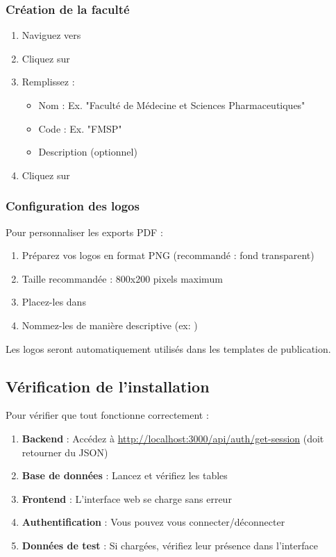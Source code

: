 \subsubsection{Création de la faculté}

\begin{enumerate}[leftmargin=*]
    \item Naviguez vers 
    \item Cliquez sur 
    \item Remplissez :
    \begin{itemize}
        \item Nom : Ex. "Faculté de Médecine et Sciences Pharmaceutiques"
        \item Code : Ex. "FMSP"
        \item Description (optionnel)
    \end{itemize}
    \item Cliquez sur 
\end{enumerate}

\subsubsection{Configuration des logos}

Pour personnaliser les exports PDF :

\begin{enumerate}[leftmargin=*]
    \item Préparez vos logos en format PNG (recommandé : fond transparent)
    \item Taille recommandée : 800x200 pixels maximum
    \item Placez-les dans 
    \item Nommez-les de manière descriptive (ex: )
\end{enumerate}

Les logos seront automatiquement utilisés dans les templates de publication.

\subsection{Vérification de l'installation}

Pour vérifier que tout fonctionne correctement :

\begin{enumerate}[leftmargin=*]
    \item \textbf{Backend} : Accédez à \url{http://localhost:3000/api/auth/get-session} (doit retourner du JSON)
    \item \textbf{Base de données} : Lancez  et vérifiez les tables
    \item \textbf{Frontend} : L'interface web se charge sans erreur
    \item \textbf{Authentification} : Vous pouvez vous connecter/déconnecter
    \item \textbf{Données de test} : Si chargées, vérifiez leur présence dans l'interface
\end{enumerate}

